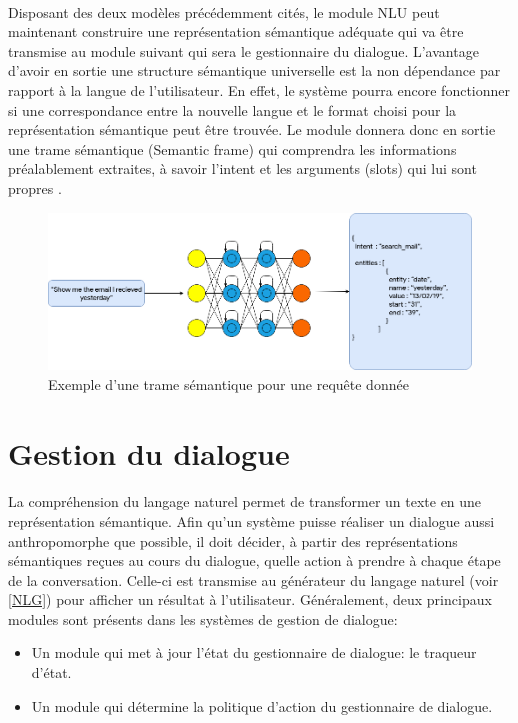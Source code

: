 		\paragraph{}
		Disposant des deux modèles précédemment cités, le module NLU peut maintenant construire une représentation sémantique adéquate qui va être transmise au module suivant qui sera le gestionnaire du dialogue. L'avantage d'avoir en sortie une structure sémantique universelle est la non dépendance par rapport à la langue de l'utilisateur. En effet, le système pourra encore fonctionner si une correspondance entre la nouvelle langue et le format choisi pour la représentation sémantique peut être trouvée. Le module donnera donc en sortie une trame sémantique (Semantic frame) qui comprendra les informations préalablement extraites, à savoir l'intent et les arguments (slots) qui lui sont propres \cite{intent_classification,intent_slots,semantic_frame}.
		\begin{figure}[H]
			\centering
			\includegraphics[width=0.80\linewidth]{images/NLU/semantic_frames.png}
			\caption{Exemple d'une trame sémantique pour une requête donnée}
			\label{fig:semanticFrame}
		\end{figure} 
\section{Gestion du dialogue}
	\paragraph{}
	La compréhension du langage naturel permet de transformer un texte en une représentation sémantique. Afin qu’un système puisse réaliser un dialogue aussi anthropomorphe que possible, il doit décider, à partir des représentations sémantiques reçues au cours du dialogue, quelle action à prendre à chaque étape de la conversation. Celle-ci est transmise au générateur du langage naturel (voir \ref{NLG}) pour afficher un résultat à l’utilisateur. Généralement, deux principaux modules sont présents dans les systèmes de gestion de dialogue:
\begin{itemize}
	\item Un module qui met à jour l’état du gestionnaire de dialogue: le traqueur d'état.
	\item Un module qui détermine la politique d’action du gestionnaire de dialogue.
\end{itemize}

